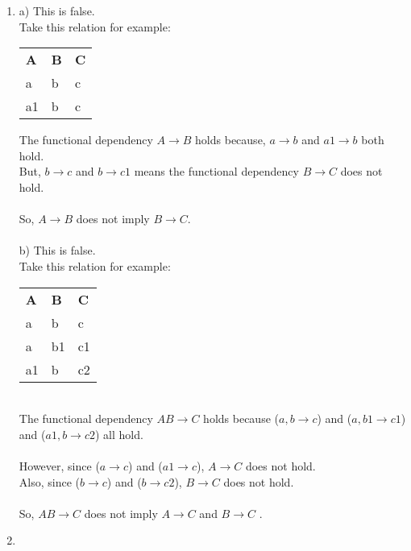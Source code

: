 \documentclass{article}
\begin{document}
\begin{enumerate}
    \item %
    a) This is false. 
    \\ Take this relation for example:
  
    	\begin{table}[h]
    	\centering
		\begin{tabular}{lll}
		\textbf{A}&\textbf{B}&\textbf{C}\\
		a  & b & c \\
		a1 & b & c
		\end{tabular}
		\end{table}
		The functional dependency $A \rightarrow B$ holds because, $a \rightarrow b$ and $a1 \rightarrow b$  both hold.
		\\
		But, $b \rightarrow c$ and $b \rightarrow c1$ means the  functional dependency $B \rightarrow C$ does not hold.
		\\ \\
		So,  $A \rightarrow B$ does not imply $B \rightarrow C$.
		\\ \\
		b) This is false.
		\\ Take this relation for example:
		\begin{table}[h]
		  \centering
		\begin{tabular}{lll}
			\textbf{A}&\textbf{B}&\textbf{C}\\
			a  & b  & c  \\
			a  & b1 & c1 \\	
			a1 & b  & c2
		\end{tabular}
		\end{table}
		\\
		The functional dependency $AB \rightarrow C$ holds because ($a,b \rightarrow c$) and ($a,b1 \rightarrow c1$) and ($a1,b \rightarrow c2$) all hold.
		\\
		\\
		However, since ($a \rightarrow c$) and ($a1 \rightarrow c$),
		$A \rightarrow C$ does not hold. \\
		Also, since ($b \rightarrow c$) and ($b \rightarrow c2$),
		$B \rightarrow C$ does not hold.
		\\ \\
		So,  $AB \rightarrow C$ does not imply $A \rightarrow C$ and $B \rightarrow C$ .
		
    \item %
       

\end{enumerate}
\end{document}
